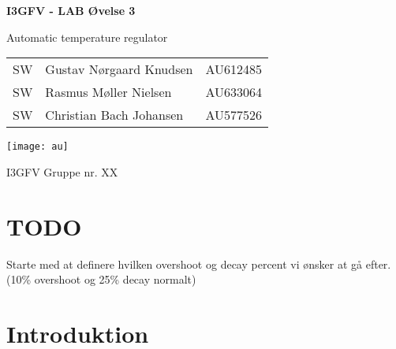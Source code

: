 \documentclass{article}
\begin{document}
\begin{titlepage}
    
  \begin{center}
    \vspace*{1cm}

    \Huge
    \textbf{I3GFV - LAB Øvelse 3}

    \vspace{0.5cm}
    \huge
    Automatic temperature regulator \\
    \date\today

    \vfill

    \Large
    \begin{tabular}{l l r}
      SW  & Gustav Nørgaard Knudsen  	& AU612485 \\
      SW  & Rasmus Møller Nielsen    	& AU633064 \\
      SW  & Christian Bach Johansen  	& AU577526 \\
    \end{tabular}
    
    \vfill
    \texttt{[image: au]}
    \vspace{1cm}

    I3GFV Gruppe nr. XX

  \end{center}
\end{titlepage}

\newpage

\tableofcontents
\newpage

\setcounter{page}{1}

\section{TODO}

\begin{enum}
	\item Starte med at definere hvilken overshoot og decay percent vi ønsker at gå efter. (10\% overshoot og 25\% decay normalt)
	\item 
\end{enum}


\section{Introduktion}


\end{document}
